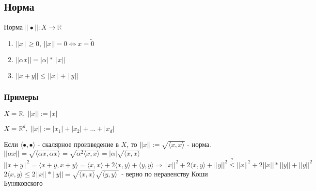 \subsection{Норма}
    
    \begin{conj}
        Норма $||\bullet || : X\to \mathbb{R}$\\
        \begin{enumerate}
            \item $||x|| \geqslant 0$, $||x|| = 0 \Longleftrightarrow x = \overleftarrow{0}$
            \item $||\alpha x|| = |\alpha|*||x||$
            \item $||x+y|| \leqslant ||x||+||y||$
        \end{enumerate}
    \end{conj}
    
    \subsubsection*{Примеры}
    $X = \mathbb{R},\ ||x||:=|x|$
    
    $X = \mathbb{R}^d,\ ||x||:=|x_1|+|x_2|+...+|x_d|$
    \begin{theorem-non}
        Если $\langle \bullet, \bullet \rangle$ - скалярное произведение в $X$, то $||x||:= \sqrt{\langle x, x \rangle}$ - норма.\\
        $||\alpha x|| = \sqrt{\langle \alpha x, \alpha x\rangle} = \sqrt{\alpha^2 \langle x, x\rangle} = |\alpha|\sqrt{\langle x, x \rangle}$\\
        $||x+y||^2 = \langle x+y, x+y \rangle = \langle x,x\rangle + 2\langle x, y\rangle + \langle y, y\rangle \Longrightarrow ||x||^2 + 2\langle x, y\rangle + ||y||^2 \overset{?}{\leq} ||x||^2 + 2||x||*||y|| + ||y||^2$ \vspace*{0,001cm}\\
        $2\langle x, y \rangle \leqslant 2||x||*||y|| = \sqrt{\langle x, x\rangle}\sqrt{\langle y, y\rangle\ }$ - верно по неравенству Коши Буняковского
    \end{theorem-non}
    
